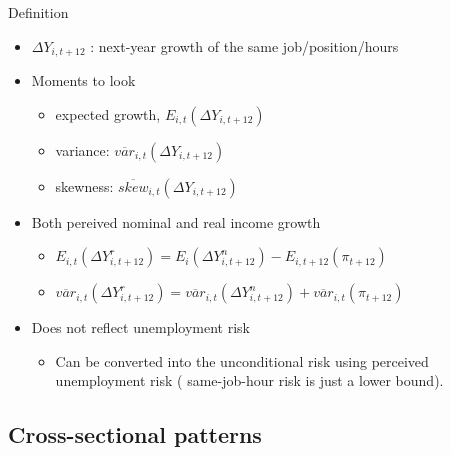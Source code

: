 \documentclass{beamer}
\begin{document}
\begin{frame}{Definition}
	\begin{itemize}
		\item $\Delta Y_{i,t+12}$ : next-year growth of the same job/position/hours
		\item Moments to look
		\begin{itemize}
			\item expected growth, $E_{i,t} (\Delta Y_{i,t+12})$
			\item variance: $\overline {var}_{i,t}(\Delta Y_{i,t+12})$
			\item skewness: $\overline {skew}_{i,t}(\Delta Y_{i,t+12})$
		\end{itemize}
		\item Both pereived nominal and real income growth 
		\begin{itemize}
			\item $E_{i,t}(\Delta Y^r_{i,t+12}) =E_i(\Delta Y_{i,t+12}^n) - E_{i,t+12}(\pi_{t+12})$
			\item $\overline{var}_{i,t}(\Delta Y_{i,t+12}^r) =\overline {var}_{i,t}(\Delta Y_{i,t+12}^n) +  \overline {var}_{i,t}(\pi_{t+12})$
		\end{itemize}
		\item Does not reflect unemployment risk 
		\begin{itemize}
			\item Can be converted into the unconditional risk using perceived unemployment risk ( same-job-hour risk is just a lower bound).  %
		\end{itemize}
	\end{itemize}
\end{frame}

\subsection{Cross-sectional patterns}

\end{document}
